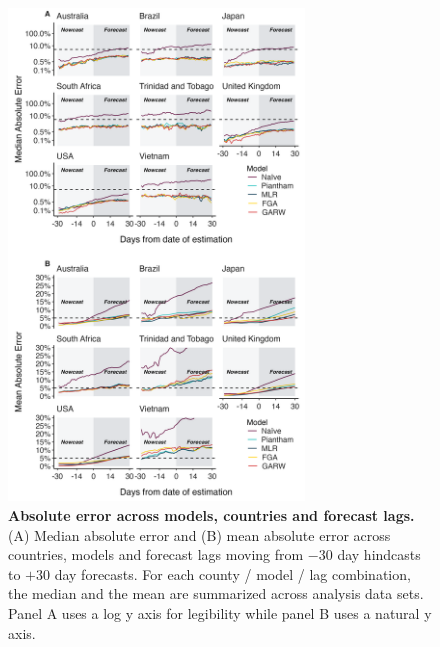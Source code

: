 \begin{figure}[h!]
	\centering
	\includegraphics[width=0.70\textwidth]{figures/model_comp_A.png}
	\caption{\textbf{Absolute error across models, countries and forecast lags.}
	(A) Median absolute error and (B) mean absolute error across countries, models and forecast lags moving from $-30$ day hindcasts to $+30$ day forecasts.
	For each county / model / lag combination, the median and the mean are summarized across analysis data sets.
	Panel A uses a log y axis for legibility while panel B uses a natural y axis.
	}
	\label{fig:Fig2}
\end{figure}

